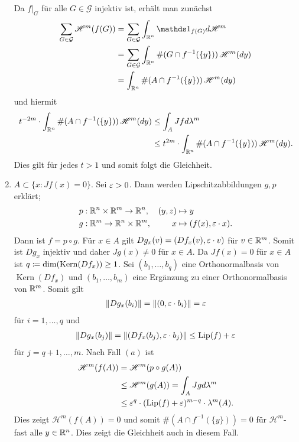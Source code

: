 \documentclass[a4paper,twoside,DIV15,BCOR12mm]{scrbook}
\newcommand{\ind}{\mathds 1}
\newcommand{\HM}{\mathscr H}
\DeclareMathOperator{\Lip}{Lip}
\DeclareMathOperator{\Kern}{Kern}
\begin{document}
\begin{beweis}
\begin{enumerate}[{Fall} (a):]
Da $f|_G$ für alle $G\in\mathcal G$ injektiv ist, erhält man zunächst
\begin{align*}
\sum_{G\in\mathcal G} \HM^m(f(G))
&= \sum_{G\in\mathcal G} \int_{\MdR^n} \ind_{f(G)} d\HM^m \\
&= \sum_{G\in\mathcal G} \int_{\MdR^n} \#(G\cap f^{-1}(\{y\}))\, \HM^m(dy) \\
&= \int_{\MdR^n} \#(A\cap f^{-1}(\{y\}))\, \HM^m(dy)
\end{align*}
und hiermit
\begin{align*}
t^{-2m}\cdot \int_{\MdR^n} \#(A\cap f^{-1}(\{y\}))\, \HM^m(dy) 
&\le \int_A Jfd\lambda^m \\
&\le t^{2m} \cdot \int_{\MdR^n} \#(A\cap f^{-1}(\{y\})) \, \HM^m(dy).
\end{align*}
Dies gilt für jedes $t>1$ und somit folgt die Gleichheit.
\item $A\subset \{x: Jf(x) = 0\}$. Sei $\varepsilon>0$. Dann werden Lipschitzabbildungen $g,p$ erklärt;
\begin{align*}
p: {}&\mathbb{R}^n\times\mathbb{R}^m \to\mathbb{R}^n, & (y,z) &\mapsto y \\
g: {}&\mathbb{R}^m\to\mathbb{R}^n\times\mathbb{R}^m,  & x&\mapsto (f(x),\varepsilon\cdot x).
\end{align*}
Dann ist $f= p\circ g$. Für $x\in A$ gilt $Dg_x(v) = (Df_x(v), \varepsilon\cdot v)$ für $v\in\mathbb{R}^m$. Somit ist $Dg_x$ injektiv und daher $Jg(x)\ne 0$ für $x\in A$. Da $Jf(x)=0$ für $x\in A$ ist $q \da \dim(\Kern(Df_x)) \ge 1$.  Sei $(b_1,\ldots,b_q)$ eine Orthonormalbasis von $\Kern(Df_x)$ und $(b_1,\ldots,b_m)$ eine Ergänzung zu einer Orthonormalbasis von $\mathbb{R}^m$. Somit gilt
\begin{align*}
\|Dg_x(b_i)\| = \|(0,\varepsilon \cdot b_i)\| = \varepsilon
\end{align*}
für $i=1,\ldots,q$ und
\begin{align*}
\|Dg_x(b_j)\| = \|(Df_x(b_j),\ep\cdot b_j)\| \le \Lip(f) + \ep
\end{align*}
für $j=q+1,\ldots,m$. Nach Fall $(a)$ ist
\begin{align*}
\HM^m(f(A)) &= \HM^m(p\circ g(A))\\
&\le \HM^m(g(A)) = \int_{A} Jgd\lambda^m\\
&\le \ep^q\cdot(\Lip(f)+\ep)^{m-q}\cdot\lambda^m(A).
\end{align*}
Dies zeigt $\HM^m(f(A))=0$ und somit $\#(A\cap f^{-1}(\{y\})) = 0$ für $\HM^m$-fast alle $y\in\mathbb{R}^n$. Dies zeigt die Gleichheit auch in diesem Fall.
\end{enumerate}
\end{beweis}
\end{document}
